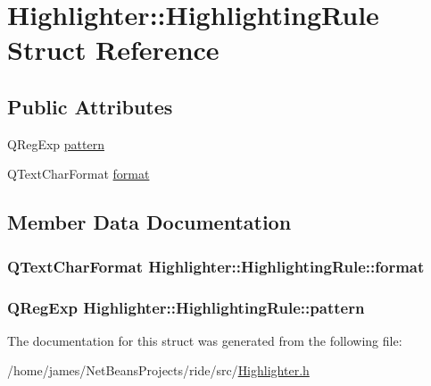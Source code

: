 \hypertarget{struct_highlighter_1_1_highlighting_rule}{\section{Highlighter\-:\-:Highlighting\-Rule Struct Reference}
\label{struct_highlighter_1_1_highlighting_rule}
}
\subsection*{Public Attributes}
\begin{DoxyCompactItemize}
\item 
Q\-Reg\-Exp \hyperlink{struct_highlighter_1_1_highlighting_rule_aaecab525cb637802e0c4a10e8832cd84}{pattern}
\item 
Q\-Text\-Char\-Format \hyperlink{struct_highlighter_1_1_highlighting_rule_ae0a636ba88b740accc9b98ca777b6fb4}{format}
\end{DoxyCompactItemize}


\subsection{Member Data Documentation}
\hypertarget{struct_highlighter_1_1_highlighting_rule_ae0a636ba88b740accc9b98ca777b6fb4}{
\subsubsection[{format}]{\setlength{\rightskip}{0pt plus 5cm}Q\-Text\-Char\-Format Highlighter\-::\-Highlighting\-Rule\-::format}}\label{struct_highlighter_1_1_highlighting_rule_ae0a636ba88b740accc9b98ca777b6fb4}
\hypertarget{struct_highlighter_1_1_highlighting_rule_aaecab525cb637802e0c4a10e8832cd84}{
\subsubsection[{pattern}]{\setlength{\rightskip}{0pt plus 5cm}Q\-Reg\-Exp Highlighter\-::\-Highlighting\-Rule\-::pattern}}\label{struct_highlighter_1_1_highlighting_rule_aaecab525cb637802e0c4a10e8832cd84}


The documentation for this struct was generated from the following file\-:\begin{DoxyCompactItemize}
\item 
/home/james/\-Net\-Beans\-Projects/ride/src/\hyperlink{_highlighter_8h}{Highlighter.\-h}\end{DoxyCompactItemize}
